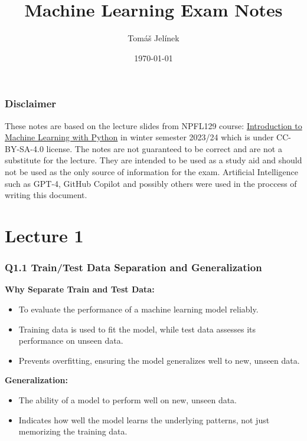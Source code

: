 \documentclass[11pt]{article}
\title{Machine Learning Exam Notes}
\author{Tomáš Jelínek}
\date{\today}
\begin{document}
\maketitle

\tableofcontents

\newpage

\section{Disclaimer}
These notes are based on the lecture slides from NPFL129 course: \href{https://ufal.mff.cuni.cz/courses/npfl129/2324-winter#home}{Introduction to Machine Learning with Python} in winter semester 2023/24 which is under CC-BY-SA-4.0 license. The notes are not guaranteed to be correct and are not a substitute for the lecture. They are intended to be used as a study aid and should not be used as the only source of information for the exam.
Artificial Intelligence such as GPT-4, GitHub Copilot and possibly others were used in the proccess of writing this document.

\part{Lecture 1}
\section{Q1.1 Train/Test Data Separation and Generalization}

\textbf{Why Separate Train and Test Data:}
\begin{itemize}
    \item To evaluate the performance of a machine learning model reliably.
    \item Training data is used to fit the model, while test data assesses its performance on unseen data.
    \item Prevents overfitting, ensuring the model generalizes well to new, unseen data.
\end{itemize}

\textbf{Generalization:}
\begin{itemize}
    \item The ability of a model to perform well on new, unseen data.
    \item Indicates how well the model learns the underlying patterns, not just memorizing the training data.
\end{itemize}
\end{document}
